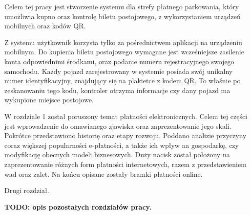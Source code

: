 Celem tej pracy jest stworzenie systemu dla strefy płatnego parkowania, który  umożliwia kupno oraz kontrolę biletu postojowego, z wykorzystaniem urządzeń mobilnych oraz kodów QR.

Z systemu użytkownik korzysta tylko za pośrednictwem aplikacji na urządzeniu mobilnym. Do kupienia biletu postojowego wymagane jest wcześniejsze zasilenie konta odpowiednimi środkami, oraz podanie numeru rejestracyjnego swojego samochodu. Każdy pojazd zarejestrowany w systemie posiada swój unikalny numer identyfikacyjny, znajdujący się na plakietce z kodem QR. To właśnie po zeskanowaniu tego kodu, kontroler otrzyma informacje czy dany pojazd ma wykupione miejsce postojowe.

W rozdziale 1 został poruszony temat płatności elektronicznych. Celem tej części jest wprowadzenie do omawianego zjawiska oraz zaprezentowanie jego skali. Pokrótce przedstawiono historię oraz etapy rozwoju. Poddano analizie przyczyny coraz większej popularności e-płatności, a także ich wpływ na gospodarkę, czy modyfikację obecnych modeli biznesowych. Duży nacisk został położony na zaprezentowanie różnych form płatności internetowych, razem z przedstawieniem wad oraz zalet. Na końcu opisane zostały bramki płatności online.

Drugi rozdział.

\textbf{TODO: opis pozostałych rozdziałów pracy.}


